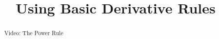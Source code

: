 \documentclass[handout]{ximera}
\title{Using Basic Derivative Rules}
\begin{document}
\begin{abstract} Video: The Power Rule %
\end{abstract}

\maketitle

\end{document}
